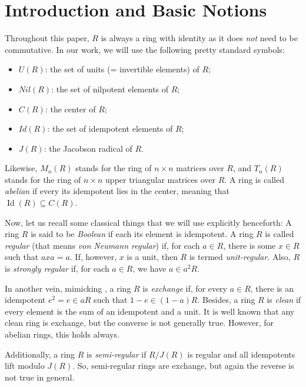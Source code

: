 \documentclass[12pt]{amsart}
\theoremstyle{definition}
\begin{document}
\section{Introduction and Basic Notions}

Throughout this paper, \(R\) is always a ring with identity as it does {\it not} need to be commutative. In our work, we will use the following pretty standard symbols:

\medskip

\begin{itemize}
\item \(U(R)\): the set of units (= invertible elements) of \(R\);
\item \(Nil(R)\): the set of nilpotent elements of \(R\);
\item \(C(R)\): the center of \(R\);
\item \(Id(R)\): the set of idempotent elements of \(R\);
\item \(J(R)\): the Jacobson radical of \(R\).
\end{itemize}

\medskip

Likewise, \(M_n(R)\) stands for the ring of \(n \times n\) matrices over \(R\), and \(T_n(R)\) stands for the ring of \(n \times n\) upper triangular matrices over \(R\). A ring is called {\it abelian} if every its idempotent lies in the center, meaning that \(\operatorname{Id}(R) \subseteq C(R)\).
	
Now, let us recall some classical things that we will use explicitly henceforth: A ring \(R\) is said to be {\it Boolean} if each its element is idempotent. A ring \(R\) is called {\it regular} (that means {\it von Neumann regular}) if, for each \(a\in R\), there is some \(x\in R\) such that \(axa=a\). If, however, \(x\) is a unit, then \(R\) is termed {\it unit-regular}. Also, \(R\) is {\it strongly regular} if, for each \(a\in R\), we have \(a\in a^2R\).

In another vein, mimicking \cite{8}, a ring \(R\) is {\it exchange} if, for every \(a\in R\), there is an idempotent \(e^2=e\in aR\) such that \(1-e\in (1-a)R\). Besides, a ring \(R\) is {\it clean} if every element is the sum of an idempotent and a unit. It is well known that any clean ring is exchange, but the converse is not generally true. However, for abelian rings, this holds always.

Additionally, a ring \(R\) is {\it semi-regular} if \(R/J(R)\) is regular and all idempotents lift modulo \(J(R)\). So, semi-regular rings are exchange, but again the reverse is not true in general.
	
\end{document}
